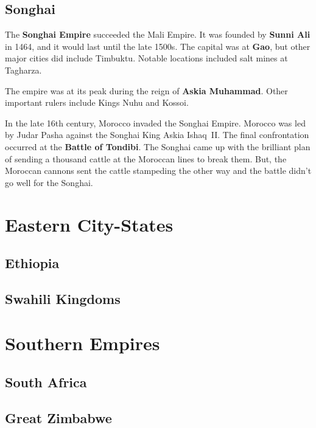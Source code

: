 \subsection*{Songhai}

The \textbf{Songhai Empire} succeeded the Mali Empire.
It was founded by \textbf{Sunni Ali} in 1464, and it would last until the late 1500s.
The capital was at \textbf{Gao}, but other major cities did include Timbuktu.
Notable locations included salt mines at Tagharza.

The empire was at its peak during the reign of \textbf{Askia Muhammad}.
Other important rulers include Kings Nuhu and Kossoi.

In the late 16th century, Morocco invaded the Songhai Empire.
Morocco was led by Judar Pasha against the Songhai King Askia Ishaq~II\@.
The final confrontation occurred at the \textbf{Battle of Tondibi}.
The Songhai came up with the brilliant plan of sending a thousand cattle at the Moroccan lines to break them.
But, the Moroccan cannons sent the cattle stampeding the other way and the battle didn't go well for the Songhai.

\section{Eastern City-States}

\subsection*{Ethiopia}

\subsection*{Swahili Kingdoms}

\section{Southern Empires}

\subsection*{South Africa}

\subsection*{Great Zimbabwe}

